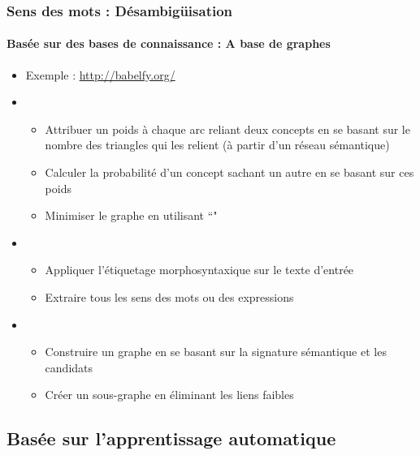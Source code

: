 \documentclass[xcolor=table]{beamer}
\begin{document}
\begin{frame}
\frametitle{Sens des mots : Désambigüisation}
\framesubtitle{Basée sur des bases de connaissance : A base de graphes}
	
\begin{itemize}
	\item Exemple : \url{http://babelfy.org/} \cite{2014-moro-al}
	\item {}
	\begin{itemize}
		\item Attribuer un poids à chaque arc reliant deux concepts en se basant sur le nombre des triangles qui les relient (à partir d'un réseau sémantique)
		\item Calculer la probabilité d'un concept sachant un autre en se basant sur ces poids
		\item Minimiser le graphe en utilisant ``"
	\end{itemize}
	\item {}
	\begin{itemize}
		\item Appliquer l'étiquetage morphosyntaxique sur le texte d'entrée
		\item Extraire tous les sens des mots ou des expressions
	\end{itemize}
	\item {}
	\begin{itemize}
		\item Construire un graphe en se basant sur la signature sémantique et les candidats
		\item Créer un sous-graphe en éliminant les liens faibles
	\end{itemize}
\end{itemize}

\end{frame}

\subsection{Basée sur l'apprentissage automatique}
\end{document}
